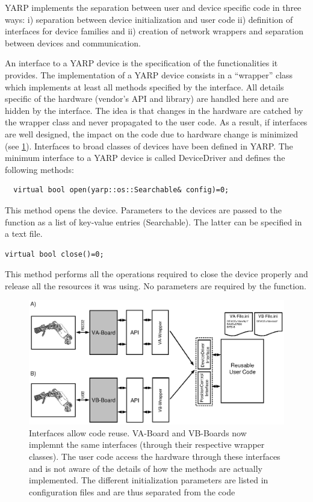 YARP implements the separation between user and device specific code 
in three ways: i) separation between device initialization and user code 
ii) definition of interfaces for device families and ii) creation of 
network wrappers and separation between devices and communication. 

An interface to a YARP device is the specification of the functionalities
it provides. The implementation of a YARP device consists in a  
``wrapper'' class which implements at least all methods specified by
the interface. All details specific of the hardware (vendor's API and 
library) are handled here and are hidden by the interface. The idea is 
that changes in the hardware are catched by the wrapper class and never 
propagated to the user code. As a result, if interfaces are well designed,
 the impact on the code due to hardware change is minimized (see 
\ref{fig:devices2}). 
Interfaces to broad classes of devices have been defined in YARP. The 
minimum interface to a YARP device is called DeviceDriver and defines 
the following methods:

\begin{verbatim}
  virtual bool open(yarp::os::Searchable& config)=0;
\end{verbatim}

This method opens the device. Parameters to the devices are passed to the
function as a list of key-value entries (Searchable). The latter can be 
specified in a text file.

\begin{verbatim}
virtual bool close()=0;
\end{verbatim}

This method performs all the operations required to close the 
device properly and release all the resources it was using. No
parameters are required by the function.

\begin{figure}[tbp]
\centerline{
\includegraphics[width=24cm]{fig-devices2.eps}
}
\caption{Interfaces allow code reuse. VA-Board and VB-Boards now implemnt
the same interfaces (through their respective wrapper classes). The user 
code access the hardware through these interfaces and is not aware of 
the details of how the methods are actually implemented. The different 
initialization parameters are listed in configuration files and are thus 
separated from the code}\label{fig:devices2}
\end{figure}

